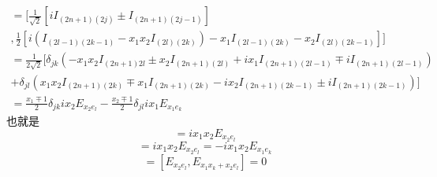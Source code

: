 \documentclass{ctexart}
\begin{document}
	\begin{multline}
	[E_{\pm e_j},E_{x_1e_k+x_2e_l}]=\bigg[\frac{1}{\sqrt 2}\left[iI_{(2n+1)(2j)}\pm I_{(2n+1)(2j-1)}\right]\\,\frac{1}{2}\left[i(I_{(2l-1)(2k-1)}-x_1x_2 I_{(2l)(2k)})-x_1I_{(2l-1)(2k)}-x_2I_{(2l)(2k-1)}\right]\bigg]\\
	=\frac{1}{2\sqrt 2}\bigg[\delta_{jk}(-x_1x_2I_{(2n+1)2l}\pm x_2I_{(2n+1)(2l)}+ix_1I_{(2n+1)(2l-1)}\mp iI_{(2n+1)(2l-1)})\\+\delta_{jl}(x_1x_2I_{(2n+1)(2k)}\mp x_1I_{(2n+1)(2k)}-ix_2I_{(2n+1)(2k-1)}\pm i I_{(2n+1)(2k-1)})\bigg]\\
	=\frac{x_1\mp 1}{2}\delta_{jk}ix_2E_{x_2e_l}-\frac{x_2\mp 1}{2}\delta_{jl}ix_1E_{x_1e_k}
	\end{multline}
	也就是
	\begin{equation}
	[E_{-x_1e_k},E_{x_1x_k+x_2e_l}]=ix_1x_2E_{x_2e_l}
	\end{equation}
	\begin{equation}
	[E_{-x_2e_l},E_{x_1x_k+x_2e_l}]=ix_1x_2E_{x_2e_l}=-ix_1x_2E_{x_1e_k}
	\end{equation}
	\begin{equation}
	[E_{x_1e_k},E_{x_1x_k+x_2e_l}]=[E_{x_2e_l},E_{x_1x_k+x_2e_l}]=0
	\end{equation}
	
\end{document}

